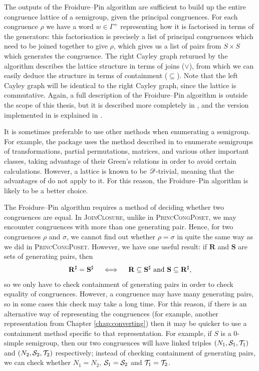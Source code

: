 The outputs of the Froidure--Pin algorithm are sufficient to build up the entire
congruence lattice of a semigroup, given the principal congruences.  For each
congruence $\rho$ we have a word $w \in \Gamma^+$ representing how it is
factorised in terms of the generators: this factorisation is precisely a list of
principal congruences which need to be joined together to give $\rho$, which
gives us a list of pairs from $S \times S$ which generates the congruence.  The
right Cayley graph returned by the algorithm describes the lattice structure in
terms of joins ($\vee$), from which we can easily deduce the structure in terms
of containment ($\subseteq$).  Note that the left Cayley graph will be identical
to the right Cayley graph, since the lattice is commutative.  Again, a full
description of the Froidure--Pin algorithm is outside the scope of this thesis,
but it is described more completely in \cite{froidure_pin}, and the version
implemented in \libsemigroups{} is explained in
\cite{froidure_pin_jonusas}.

It is sometimes preferable to use other methods when enumerating a semigroup.
For example, the \Semigroups{} package uses the method described in
\cite{computing_finite_semigroups} to enumerate semigroups of transformations,
partial permutations, matrices, and various other important classes, taking
advantage of their Green's relations in order to avoid certain calculations.
However, a lattice is known to be $\mathscr{D}$-trivial, meaning that the advantages of
\cite{computing_finite_semigroups} do not apply to it.  For this reason, the
Froidure--Pin algorithm is likely to be a better choice.

The Froidure--Pin algorithm requires a method of deciding whether two
congruences are equal.  In \textsc{JoinClosure}, unlike in
\textsc{PrincCongPoset}, we may encounter congruences with more than one
generating pair.  Hence, for two congruences $\rho$ and $\sigma$, we cannot find
out whether $\rho = \sigma$ in quite the same way as we did in
\textsc{PrincCongPoset}.  However, we have one useful result: if $\mathbf{R}$
and $\mathbf{S}$ are sets of generating pairs, then
$$\mathbf{R}^\sharp = \mathbf{S}^\sharp \quad\iff\quad
\mathbf{R} \subseteq \mathbf{S}^\sharp \textnormal{~and~}
\mathbf{S} \subseteq \mathbf{R}^\sharp,$$
so we only have to check containment of generating pairs in order to check
equality of congruences.  However, a congruence may have many generating pairs,
so in some cases this check may take a long time.  For this reason, if there is
an alternative way of representing the congruences (for example, another
representation from Chapter \ref{chap:converting}) then it may be quicker to use
a containment method specific to that representation.  For example, if $S$ is a
0-simple semigroup, then our two congruences will have linked triples
$(N_1,\mathcal{S}_1,\mathcal{T}_1)$ and $(N_2,\mathcal{S}_2,\mathcal{T}_2)$ respectively; instead of checking
containment of generating pairs, we can check whether $N_1 = N_2$,
$\mathcal{S}_1 = \mathcal{S}_2$ and $\mathcal{T}_1 = \mathcal{T}_2$.

